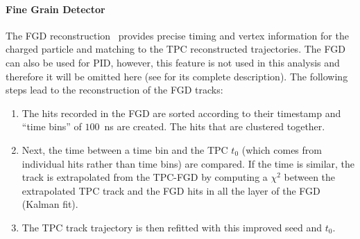 \paragraph{Fine Grain Detector}
\label{subsubsec:fgdreco}
The \Gls{FGD} reconstruction~\cite{TN072} provides precise timing and
vertex information for the charged particle and matching to the
\Gls{TPC} reconstructed trajectories. The \Gls{FGD} can also be used
for \Gls{PID}, however, this feature is not used in this analysis and
therefore it will be omitted here (see \cite{TN072} for its complete
description). The following steps lead to the reconstruction of the
\Gls{FGD} tracks:
\begin{enumerate}[noitemsep,topsep=0pt]
\item The hits recorded in the \Gls{FGD} are sorted according to their
  timestamp and ``time bins'' of $100$~ns are created. The hits that
  are clustered together.
\item Next, the time between a time bin and the \Gls{TPC} $t_0$ (which
  comes from individual hits rather than time bins) are compared. If
  the time is similar, the track is extrapolated from the
  \Gls{TPC}-\Gls{FGD} by computing a $\chi^2$ between the extrapolated
  \Gls{TPC} track and the \Gls{FGD} hits in all the layer of the
  \Gls{FGD} (Kalman fit).
\item The \Gls{TPC} track trajectory is then refitted with this
  improved seed and $t_0$.
\end{enumerate}

